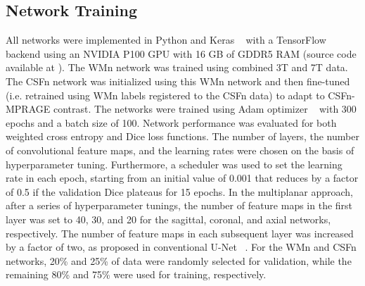 \documentclass[3p,,final,12pt]{elsarticle}
\begin{document}
\subsection{Network Training} All networks were implemented in Python and Keras \unskip~\cite{1643371:26789919} with a TensorFlow backend using an NVIDIA P100 GPU with 16 GB of GDDR5 RAM (source code available at ). The WMn network was trained using combined 3T and 7T data. The CSFn network was initialized using this WMn network and then fine-tuned (i.e. retrained using WMn labels registered to the CSFn data) to adapt to CSFn-MPRAGE contrast. The networks were trained using Adam optimizer \unskip~\cite{1643371:26789915} with 300 epochs and a batch size of 100. Network performance was evaluated for both weighted cross entropy and Dice loss functions. The number of layers, the number of convolutional feature maps, and the learning rates were chosen on the basis of hyperparameter tuning. Furthermore, a scheduler was used to set the learning rate in each epoch, starting from an initial value of 0.001 that reduces by a factor of 0.5 if the validation Dice plateaus for 15 epochs. In the multiplanar approach, after a series of hyperparameter tunings, the number of feature maps in the first layer was set to 40, 30, and 20 for the sagittal, coronal, and axial networks, respectively. The number of feature maps in each subsequent layer was increased by a factor of two, as proposed in conventional U-Net \unskip~\cite{1643371:26789965}. For the WMn and CSFn networks, 20\% and 25\% of data were randomly selected for validation, while the remaining 80\% and 75\% were used for training, respectively. 
\end{document}
